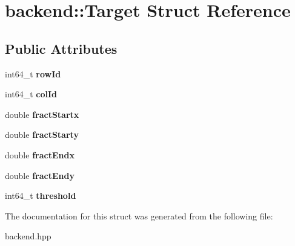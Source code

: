 \hypertarget{structbackend_1_1_target}{}\section{backend\+:\+:Target Struct Reference}
\label{structbackend_1_1_target}
\subsection*{Public Attributes}
\begin{DoxyCompactItemize}
\item 
\mbox{\label{structbackend_1_1_target_a82a3cc2354c8f5cc8f73dd035686a7ae}} 
int64\+\_\+t {\bfseries row\+Id}
\item 
\mbox{\label{structbackend_1_1_target_adb150295c006beca37c931d0a9d075e5}} 
int64\+\_\+t {\bfseries col\+Id}
\item 
\mbox{\label{structbackend_1_1_target_ace53ce7fb79199d53843ba786dd7d8ee}} 
double {\bfseries fract\+Startx}
\item 
\mbox{\label{structbackend_1_1_target_a7c0c2652d93975e915e4b6b038116bce}} 
double {\bfseries fract\+Starty}
\item 
\mbox{\label{structbackend_1_1_target_ace16e945fc4900abf2a809abd24387ae}} 
double {\bfseries fract\+Endx}
\item 
\mbox{\label{structbackend_1_1_target_a8a607576d003f341eec9bcdefc5abde8}} 
double {\bfseries fract\+Endy}
\item 
\mbox{\label{structbackend_1_1_target_a89d5a494c6baf04c5d64443d9c7bf3f6}} 
int64\+\_\+t {\bfseries threshold}
\end{DoxyCompactItemize}


The documentation for this struct was generated from the following file\+:\begin{DoxyCompactItemize}
\item 
backend.\+hpp\end{DoxyCompactItemize}
